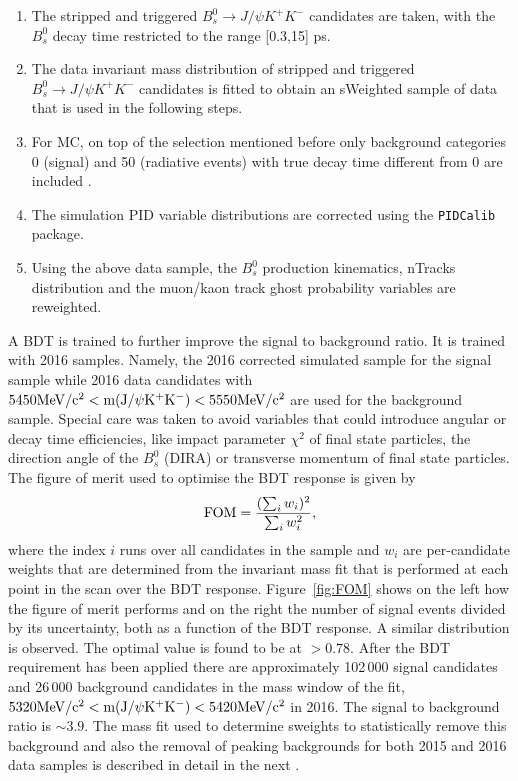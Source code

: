 \begin{enumerate}
        \item The stripped and triggered $B_s^0 \to J/\psi K^+K^-$ candidates are taken, with the $B_s^0$ decay time restricted to the range [0.3,15] ps. 
	\item The data invariant mass distribution of stripped and triggered $B_s^0 \to J/\psi K^+K^-$  candidates is fitted to obtain an sWeighted sample of data that is used in the following steps.
        \item For MC, on top of the selection mentioned before only background categories 0 (signal) and 50 (radiative events) with true decay time different from 0 are included .
	\item The simulation PID variable distributions are corrected using the {\tt PIDCalib} package.
	\item Using the above data sample, the $B_s^0$ production kinematics, nTracks distribution and the muon/kaon track ghost probability variables are reweighted.
\end{enumerate}

A BDT is trained to further improve the signal to background ratio. It is trained with 2016 samples. Namely, the 2016 corrected simulated sample for the signal sample while 2016 data candidates with $5450\rm MeV/c^2 < m(J/\psi K^+ K^-) < 5550\rm MeV/c^2$ are used
for the background sample.
Special care was taken to avoid variables that could introduce angular or decay time efficiencies, like impact parameter $\chi^2$ of final
state particles, the direction angle of the $B^0_s$ (DIRA) or transverse momentum of final state particles.
The figure of merit used to optimise the BDT response is given by
\begin{equation}
	{\rm FOM} = \frac{(\sum_i w_i)^2}{\sum_i w_i^2},
\end{equation}
where the index $i$ runs over all candidates in the sample and  $w_i$ are
per-candidate weights that are determined from the invariant mass fit
that is performed at each point in the scan over the BDT response. Figure~\ref{fig:FOM} shows on the left how the figure of merit performs and on the right the number of signal events divided by its uncertainty, both as a function of the BDT response. A similar distribution is observed. The optimal value is found to be at $> 0.78$.
After the BDT requirement has been applied there are
approximately 102\,000 signal candidates and 26\,000 background candidates
in the mass window of the fit, $5320\rm MeV/c^2 < m(J/\psi K^+ K^-) < 5420\rm MeV/c^2$ in 2016. The signal to background ratio is $\sim 3.9$. 
The mass fit used to determine sweights to statistically
remove this background and also the removal of peaking backgrounds for both 2015 and 2016 data samples is described in detail in the next .

